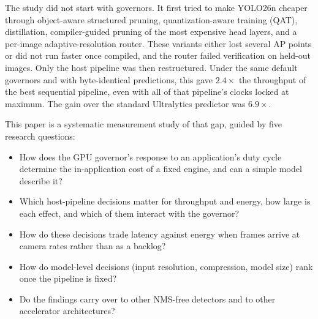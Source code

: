 The study did not start with governors. It first tried to make YOLO26n
cheaper through object-aware structured pruning, quantization-aware
training (QAT), distillation, compiler-guided pruning of the most
expensive head layers, and a per-image adaptive-resolution router.
These variants either lost several AP points or did not run faster once
compiled, and the router failed verification on held-out images. Only the
host pipeline was then restructured. Under the same default governors and with byte-identical
predictions, this gave $2.4\times$ the throughput of the best
sequential pipeline, even with all of that pipeline's clocks locked at
maximum. The gain over the standard Ultralytics predictor was
$6.9\times$.

This paper is a systematic measurement study of that gap, guided by
five research questions:
\begin{itemize}
\item[\RQ{1}] How does the GPU governor's response to an application's
  duty cycle determine the in-application cost of a fixed engine, and
  can a simple model describe it?
\item[\RQ{2}] Which host-pipeline decisions matter for throughput and
  energy, how large is each effect, and which of them interact with the
  governor?
\item[\RQ{3}] How do these decisions trade latency against energy when
  frames arrive at camera rates rather than as a backlog?
\item[\RQ{4}] How do model-level decisions (input resolution,
  compression, model size) rank once the pipeline is fixed?
\item[\RQ{5}] Do the findings carry over to other NMS-free detectors
  and to other accelerator architectures?
\end{itemize}

